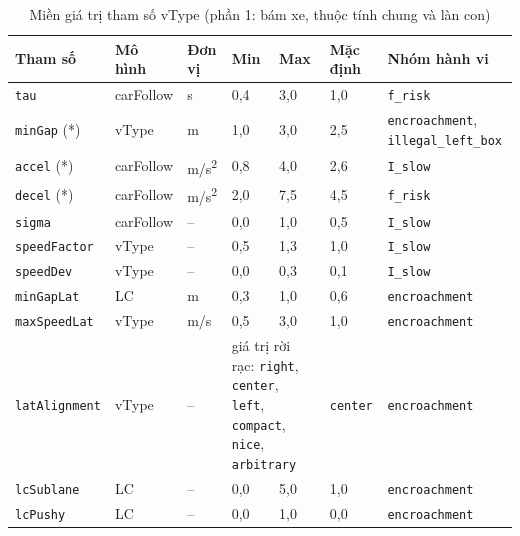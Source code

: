 \documentclass[../DoAn.tex]{subfiles}
\begin{document}
\begin{table}[H]
\centering
\small\setlength{\tabcolsep}{3pt}
\begin{tabular}{|p{3.0cm}|p{1.6cm}|p{1.2cm}|p{1.1cm}|p{1.1cm}|p{1.6cm}|p{3.2cm}|}
\hline
\textbf{Tham số} & \textbf{Mô hình} & \textbf{Đơn vị} & \textbf{Min} & \textbf{Max} & \textbf{Mặc định} & \textbf{Nhóm hành vi} \\ \hline
\texttt{tau} & carFollow & s & 0,4 & 3,0 & 1,0 & \texttt{f\_\allowbreak risk} \\ \hline
\texttt{minGap} (*) & vType & m & 1,0 & 3,0 & 2,5 & \texttt{encroachment}, \texttt{illegal\_\allowbreak left\_\allowbreak box} \\ \hline
\texttt{accel} (*) & carFollow & m/s\textsuperscript{2} & 0,8 & 4,0 & 2,6 & \texttt{I\_\allowbreak slow} \\ \hline
\texttt{decel} (*) & carFollow & m/s\textsuperscript{2} & 2,0 & 7,5 & 4,5 & \texttt{f\_\allowbreak risk} \\ \hline
\texttt{sigma} & carFollow & -- & 0,0 & 1,0 & 0,5 & \texttt{I\_\allowbreak slow} \\ \hline
\texttt{speedFactor} & vType & -- & 0,5 & 1,3 & 1,0 & \texttt{I\_\allowbreak slow} \\ \hline
\texttt{speedDev} & vType & -- & 0,0 & 0,3 & 0,1 & \texttt{I\_\allowbreak slow} \\ \hline
\texttt{minGapLat} & LC & m & 0,3 & 1,0 & 0,6 & \texttt{encroachment} \\ \hline
\texttt{maxSpeedLat} & vType & m/s & 0,5 & 3,0 & 1,0 & \texttt{encroachment} \\ \hline
\texttt{latAlignment} & vType & -- & \multicolumn{2}{p{2.2cm}|}{giá trị rời rạc: \texttt{right}, \texttt{center}, \texttt{left}, \texttt{compact}, \texttt{nice}, \texttt{arbitrary}} & \texttt{center} & \texttt{encroachment} \\ \hline
\texttt{lcSublane} & LC & -- & 0,0 & 5,0 & 1,0 & \texttt{encroachment} \\ \hline
\texttt{lcPushy} & LC & -- & 0,0 & 1,0 & 0,0 & \texttt{encroachment} \\ \hline
\end{tabular}
\caption{Miền giá trị tham số vType (phần 1: bám xe, thuộc tính chung và làn con)}
\label{table:appendix_bounds_1}
\end{table}
\end{document}
